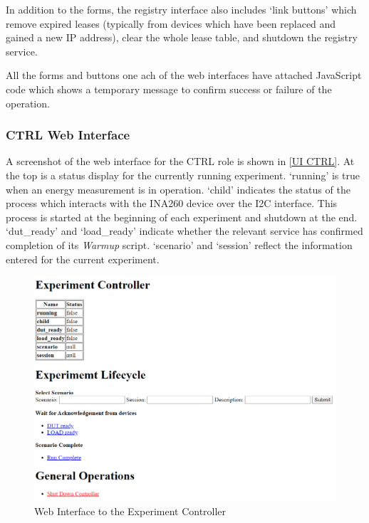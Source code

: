 In addition to the forms, the registry interface also includes `link buttons' which remove expired leases (typically from devices which have been replaced and gained a new IP address), clear the whole lease table, and shutdown the registry service.

All the forms and buttons one ach of the web interfaces have attached JavaScript code which shows a temporary message to confirm success or failure of the operation.

\subsubsection{CTRL Web Interface}
\label{Web UI CTRL}

A screenshot of the web interface for the CTRL role is shown in \autoref{UI CTRL}. At the top is a status display for the currently running experiment. `running' is true when an energy measurement is in operation. `child' indicates the status of the process which interacts with the INA260 device over the I2C interface. This process is started at the beginning of each experiment and shutdown at the end. `dut\_ready' and `load\_ready' indicate whether the relevant service has confirmed completion of its \emph{Warmup} script. `scenario' and `session' reflect the information entered for the current experiment.

\begin{figure}[ht!]
\centering
\includegraphics[width=\columnwidth]{Figures/screenshots/Controller.png}
\caption{Web Interface to the Experiment Controller}
\label{UI CTRL}
\end{figure}

